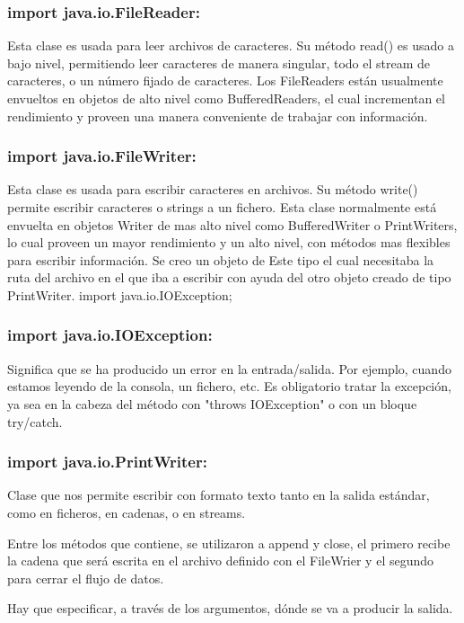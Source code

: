 \documentclass[12pt,letterpaper]{article}
\begin{document}
\subsubsection*{import java.io.FileReader:}
 
Esta clase es usada para leer archivos de caracteres. Su método read() es usado a bajo nivel, permitiendo leer caracteres de manera singular, todo el stream de caracteres, o un número fijado de caracteres. Los FileReaders están usualmente envueltos en objetos de alto nivel como BufferedReaders, el cual incrementan el rendimiento y proveen una manera conveniente de trabajar con información.


\subsubsection*{import java.io.FileWriter:}
Esta clase es usada para escribir caracteres en archivos. Su método write() permite escribir caracteres o strings a un fichero. Esta clase normalmente está envuelta en objetos Writer de mas alto nivel como BufferedWriter o PrintWriters, lo cual proveen un mayor rendimiento y un alto nivel, con métodos mas flexibles para escribir información. Se creo un objeto de Este tipo el cual necesitaba la ruta del archivo en el que iba a escribir con ayuda del otro objeto creado de tipo PrintWriter.
import java.io.IOException;




\subsubsection*{import java.io.IOException:}
Significa que se ha producido un error en la entrada/salida. Por ejemplo, cuando estamos leyendo de la consola, un fichero, etc. Es obligatorio tratar la excepción, ya sea en la cabeza del método con "throws IOException" o con un bloque try/catch.


\subsubsection*{import java.io.PrintWriter: }
Clase que nos permite escribir con formato texto tanto en la salida estándar, como en ficheros, en cadenas, o en streams.

Entre los métodos que contiene, se utilizaron a  append y close, el primero recibe la cadena que será escrita en el archivo definido con el FileWrier y el segundo para cerrar el flujo de datos.


Hay que especificar, a través de los argumentos, dónde se va a producir la salida.
\end{document}
